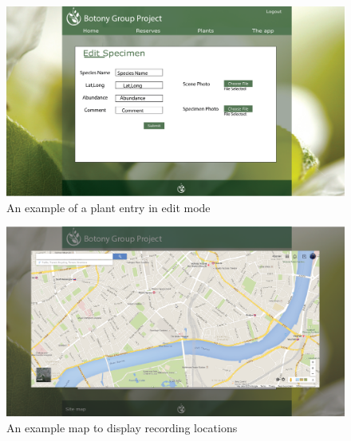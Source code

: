 \begin{landscape}
            \begin{figure}
                \centering
                \includegraphics[scale=0.4]{uiDesign/uiwebimages/editspecimen.png}
                \caption{An example of a plant entry in edit mode}
                \label{fig:editWeb}
           \end{figure}

            \begin{figure}
                \centering
                \includegraphics[scale=0.4]{uiDesign/uiwebimages/map.png}
                \caption{An example map to display recording locations}
                \label{fig:mapWeb}
            \end{figure}
        \end{landscape}